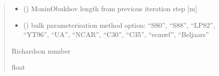 \documentclass[letterpaper,10pt,english]{sphinxmanual}
\begin{document}
\begin{fulllineitems}
\begin{quote}
\begin{description}
\begin{itemize}
\item {}
\sphinxAtStartPar
{} () \textendash{} Monin\sphinxhyphen{}Obukhov length from previous iteration step {[}m{]}

\item {}
\sphinxAtStartPar
{} () \textendash{} bulk parameterisation method option: “S80”, “S88”, “LP82”, “YT96”,
“UA”, “NCAR”, “C30”, “C35”, “ecmwf”, “Beljaars”

\end{itemize}

\sphinxAtStartPar
{} \textendash{} Richardson number

\sphinxAtStartPar
float

\end{description}\end{quote}

\end{fulllineitems}

\end{document}
